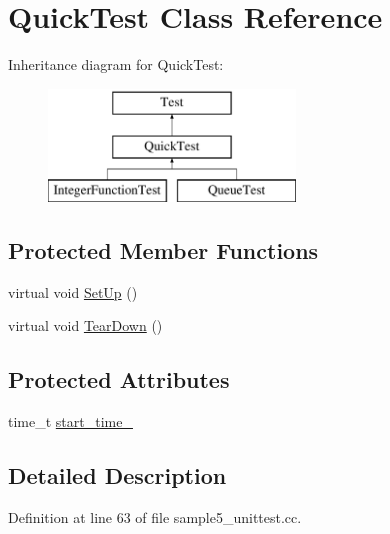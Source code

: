 \hypertarget{classQuickTest}{\section{\-Quick\-Test \-Class \-Reference}
\label{dd/df0/classQuickTest}
}
\-Inheritance diagram for \-Quick\-Test\-:\begin{figure}[H]
\begin{center}
\leavevmode
\includegraphics[height=3.000000cm]{dd/df0/classQuickTest}
\end{center}
\end{figure}
\subsection*{\-Protected \-Member \-Functions}
\begin{DoxyCompactItemize}
\item 
virtual void \hyperlink{classQuickTest_a901706a587f9ae84df8b2395fbe759cb}{\-Set\-Up} ()
\item 
virtual void \hyperlink{classQuickTest_a870a092058305911f3d42df45dd657e5}{\-Tear\-Down} ()
\end{DoxyCompactItemize}
\subsection*{\-Protected \-Attributes}
\begin{DoxyCompactItemize}
\item 
time\-\_\-t \hyperlink{classQuickTest_a146511d2ae2f8b5c118eb262868e9b68}{start\-\_\-time\-\_\-}
\end{DoxyCompactItemize}


\subsection{\-Detailed \-Description}


\-Definition at line 63 of file sample5\-\_\-unittest.\-cc.



